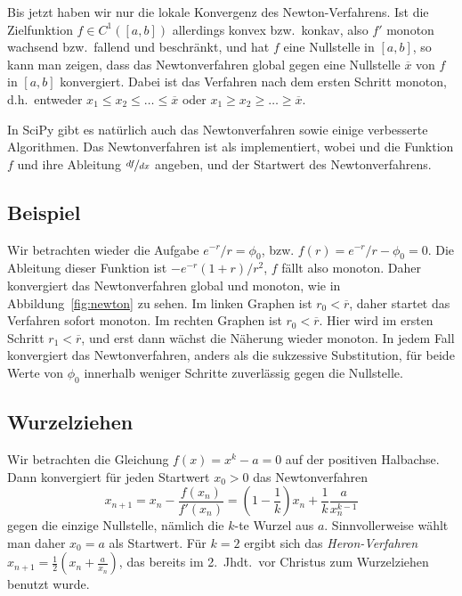 Bis jetzt haben wir nur die lokale Konvergenz des
Newton-Verfahrens. Ist die Zielfunktion $f\in C^1([a,b])$ allerdings
konvex bzw.\ konkav, also $f'$ monoton wachsend bzw.\ fallend und
beschränkt, und hat $f$ eine Nullstelle in $[a,b]$, so kann man
zeigen, dass das Newtonverfahren global gegen eine Nullstelle
$\overline{x}$ von $f$ in $[a,b]$ konvergiert. Dabei ist das Verfahren
nach dem ersten Schritt monoton, d.h.\ entweder $x_1\le
x_2\le\ldots\le\overline{x}$ oder $x_1\ge
x_2\ge\ldots\ge\overline{x}$.

In SciPy gibt es natürlich auch das Newtonverfahren sowie einige
verbesserte Algorithmen. Das Newtonverfahren ist als
 implementiert, wobei 
und  die Funktion $f$ und ihre Ableitung $\nicefrac{df}{dx}$
angeben, und  der Startwert des Newtonverfahrens.

\subsection{Beispiel}

Wir betrachten wieder die Aufgabe $e^{-r}/r = \phi_0$, bzw. $f(r) =
e^{-r}/r - \phi_0 = 0$. Die Ableitung dieser Funktion ist $-e^{-r}(1 +
r)/r^2$, $f$ fällt also monoton. Daher konvergiert das Newtonverfahren
global und monoton, wie in Abbildung~\ref{fig:newton} zu sehen. Im
linken Graphen ist $r_0<\overline{r}$, daher startet das Verfahren
sofort monoton. Im rechten Graphen ist $r_0 < \overline{r}$. Hier wird
im ersten Schritt $r_1 < \overline{r}$, und erst dann wächst die
Näherung wieder monoton. In jedem Fall konvergiert das
Newtonverfahren, anders als die sukzessive Substitution, für beide
Werte von $\phi_0$ innerhalb weniger Schritte zuverlässig gegen die
Nullstelle.

\subsection{Wurzelziehen}

Wir betrachten die Gleichung $f(x) = x^k - a = 0$ auf der positiven
Halbachse. Dann konvergiert für jeden Startwert $x_0>0$ das
Newtonverfahren
\begin{equation}
  x_{n+1} = x_n - \frac{f(x_n)}{f'(x_n)} = \left(1 -
    \frac{1}{k}\right) x_n + \frac{1}{k} \frac{a}{x_n^{k-1}}
\end{equation}
gegen die einzige Nullstelle, nämlich die $k$-te Wurzel aus
$a$. Sinnvollerweise wählt man daher $x_0=a$ als Startwert. Für $k=2$
ergibt sich das \emph{Heron-Verfahren} $x_{n+1} = \frac{1}{2}\left(x_n
  + \frac{a}{x_n}\right)$, das bereits im 2.\ Jhdt.\ vor Christus zum
Wurzelziehen benutzt wurde.

